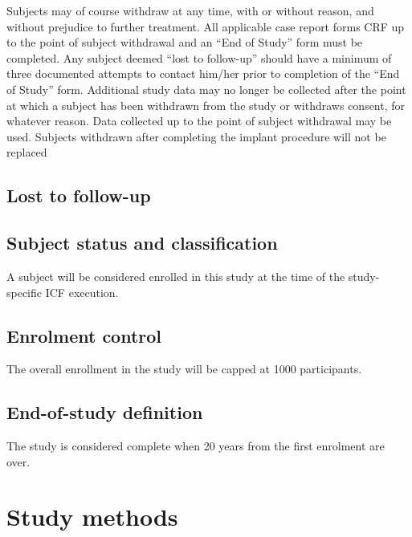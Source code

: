 Subjects may of course withdraw at any time, with or without reason, and without prejudice to further treatment. All applicable case report forms \ac{CRF} up to the point of subject withdrawal and an ``End of Study'' form must be completed. Any subject deemed ``lost to follow-up'' should have a minimum of three documented attempts to contact him/her prior to completion of the ``End of Study'' form. Additional study data may no longer be collected after the point at which a subject has been withdrawn from the study or withdraws consent, for whatever reason. Data collected up to the point of subject withdrawal may be used. Subjects withdrawn after completing the implant procedure will not be replaced 

\subsection{Lost to follow-up}
\subsection{Subject status and classification}
A subject will be considered enrolled in this study at the time of the study-specific \ac{ICF} execution.

\subsection{Enrolment control}
The overall enrollment in the study will be capped at 1000 participants.

\subsection{End-of-study definition}
The study is considered complete when 20 years from the first enrolment are over.

\section{Study methods}
